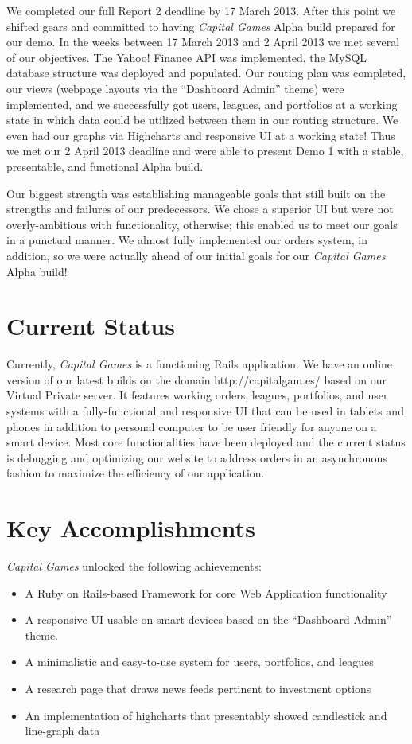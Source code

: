 We completed our full Report 2 deadline by 17 March 2013. After this point 
we shifted gears and committed to having \textit{Capital Games} Alpha build 
prepared for our demo. In the weeks between 17 March 2013 and 2 April 2013 
we met several of our objectives. The Yahoo! Finance API was implemented, 
the MySQL database structure was deployed and populated. Our routing plan 
was completed, our views (webpage layouts via the ``Dashboard Admin'' theme) 
were implemented, and we successfully got users, leagues, and portfolios 
at a working state in which data could be utilized between them in our 
routing structure. We even had our graphs via Highcharts and responsive
UI at a working state! Thus we met our 2 April 2013 deadline and were able 
to present Demo 1 with a stable, presentable, and functional Alpha build. 

Our biggest strength was establishing manageable goals that still built on 
the strengths and failures of our predecessors. We chose a superior UI but 
were not overly-ambitious with functionality, otherwise; 
this enabled us to meet our goals in a punctual manner. We almost fully 
implemented our orders system, in addition, so we were actually ahead of 
our initial goals for our \textit{Capital Games} Alpha build!

\section{Current Status}

Currently, \textit{Capital Games} is a functioning Rails application. We have an 
online version of our latest builds on the domain http://capitalgam.es/ based on 
our Virtual Private server. It features working orders, leagues, portfolios, and 
user systems with a fully-functional and responsive UI that can be used in tablets 
and phones in addition to personal computer to be user friendly for anyone on a 
smart device. Most core functionalities have been deployed and the current status is 
debugging and optimizing our website to address orders in an asynchronous fashion 
to maximize the efficiency of our application. 

\section{Key Accomplishments}

\textit{Capital Games} unlocked the following achievements:

\begin{itemize}
	\item{A Ruby on Rails-based Framework for core Web Application functionality}
	\item{A responsive UI usable on smart devices based on the ``Dashboard Admin'' theme.}
	\item{A minimalistic and easy-to-use system for users, portfolios, and leagues}
	\item{A research page that draws news feeds pertinent to investment options}
	\item{An implementation of highcharts that presentably showed candlestick and line-graph data }
\end{itemize}

